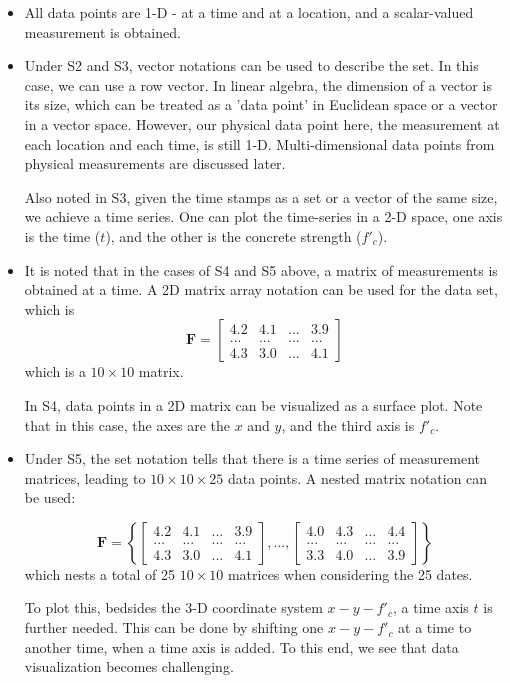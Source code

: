 \documentclass[12pt]{article}
\begin{document}
\begin{itemize}
\item All data points are 1-D - at a time and at a location, and a scalar-valued measurement is obtained.
\item Under S2 and S3, vector notations can be used to describe the set. In this case, we can use a row vector. In linear algebra, the dimension of a vector is its size, which can be treated as a 'data point' in Euclidean space or a vector in a vector space. However, our physical data point here, the measurement at each location and each time, is still 1-D. Multi-dimensional data points from physical measurements are discussed later.

Also noted in S3, given the time stamps as a set or a vector of the same size, we achieve a time series. One can plot the time-series in a 2-D space, one axis is the time ($t$), and the other is the concrete strength ($f'_c$).

\item It is noted that in the cases of S4 and S5 above, a matrix of measurements is obtained at a time. A 2D matrix array notation can be used for the data set, which is
\begin{equation*}
\bm{F} = 
\begin{bmatrix}
4.2 & 4.1 & ... & 3.9\\
... & ... & ... & ...\\
4.3 & 3.0 & ... & 4.1
\end{bmatrix}
\end{equation*}
which is a $10\times 10$ matrix.

In S4, data points in a 2D matrix can be visualized as a surface plot. Note that in this case, the axes are the $x$ and $y$, and the third axis is $f'_c$.

\item Under S5, the set notation tells that there is a time series of measurement matrices, leading to $10\times 10 \times 25$ data points. A nested matrix notation can be used:

\begin{equation*}
\bm{F} = \left\{
\begin{bmatrix}
4.2 & 4.1 & ... & 3.9\\
... & ... & ... & ...\\
4.3 & 3.0 & ... & 4.1
\end{bmatrix}
,...,
\begin{bmatrix}
4.0 & 4.3 & ... & 4.4\\
... & ... & ... & ...\\
3.3 & 4.0 & ... & 3.9
\end{bmatrix}
\right\}
\end{equation*}
which nests a total of 25 $10\times 10$ matrices when considering the 25 dates.

To plot this, bedsides the 3-D coordinate system $x - y - f'_c$, a time axis $t$ is further needed. This can be done by shifting one $x - y - f'_c$ at a time to another time, when a time axis is added. To this end, we see that data visualization becomes challenging.
\end{itemize}
\end{document}
